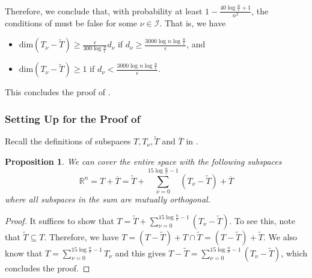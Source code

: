 \documentclass[11pt]{article}
\newtheorem{proposition}[theorem]{Proposition}
\def\dim#1{\mathrm{dim} (#1)}
\newcommand\Ttil{{\tilde{\mathit{T}}}}
\begin{document}
Therefore, we conclude that, with probability at least $1-\frac{40\log\frac{n}{\epsilon}+1}{n^2}$, the conditions of  must be false for some $\nu \in \mathcal{I}$. That is, we have
\begin{itemize}
\item $\dim{T_{\nu} -\tilde{T}} \geq \frac{\epsilon}{300\log\frac{n}{\epsilon}} d_{\nu}$ if $d_{\nu} \geq \frac{3000\log n\log\frac{n}{\epsilon}}{\epsilon}$, and 
\item $\dim{T_{\nu} -\tilde{T}} \geq 1$ if $d_{\nu} < \frac{3000\log n\log\frac{n}{\epsilon}}{\epsilon}$.
\end{itemize}
This concludes the proof of .


\subsubsection*{Setting Up for the Proof of }

Recall the definitions of subspaces $T,T_\nu,\Ttil$ and $\overline{T}$ in .

\begin{proposition}\label{prop:decomp space}
We can cover the entire space with the following subspaces
\begin{equation}\label{eq:SplitSpace}
 \mathbb{R}^n = T + \overline{T} = \tilde{T} + \sum_{\nu = 0}^{15\log \frac{n}{\epsilon}-1}(T_{\nu} -\tilde{T}) + \overline{T}
\end{equation}
where all subspaces in the sum are mutually orthogonal.
\end{proposition}
\begin{proof}
    It suffices to show that $T = \tilde{T} + \sum_{\nu = 0}^{15\log \frac{n}{\epsilon}-1}(T_{\nu} -\tilde{T})$.
    To see this, note that $\tilde{T}\subseteq T$. Therefore, we have $T = (T-\tilde{T}) + T\cap \tilde{T} = (T - \tilde{T}) + \tilde{T}$. We also know that $ T = \sum_{\nu=0}^{15\log \frac{n}{\epsilon}-1}T_{\nu}$ and this gives
$T - \tilde{T} = \sum_{\nu=0}^{15\log \frac{n}{\epsilon}-1} (T_{\nu}-\tilde{T})$, which concludes the proof.
\end{proof}
\end{document}
